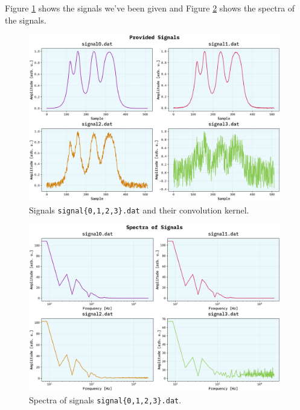 \documentclass[10pt, titlepage, a4paper]{article}
\begin{document}
Figure \ref{fig:signals-wien} shows the signals we've been given and Figure \ref{fig:spectra-wien} shows the spectra
of the signals. 

\begin{figure}[h]
    \centering
    \includegraphics[width=0.98\textwidth]{../WienerFilter/Images/signals.png}
    \caption{Signals \texttt{signal\{0,1,2,3\}.dat} and their convolution kernel.}
    \label{fig:signals-wien}
\end{figure}

\begin{figure}[h]
    \centering
    \includegraphics[width=0.98\textwidth]{../WienerFilter/Images/signals-spectra.png}
    \caption{Spectra of signals \texttt{signal\{0,1,2,3\}.dat}.}
    \label{fig:spectra-wien}
\end{figure}
\end{document}

